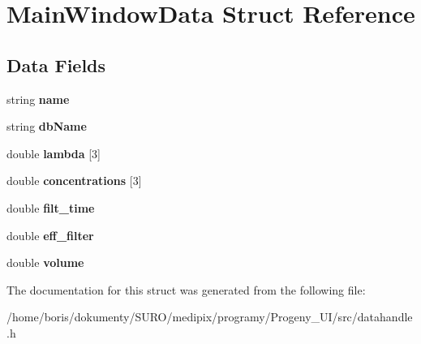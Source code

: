 \hypertarget{structMainWindowData}{\section{Main\+Window\+Data Struct Reference}
\label{structMainWindowData}
}
\subsection*{Data Fields}
\begin{DoxyCompactItemize}
\item 
\hypertarget{structMainWindowData_a13e994aac6efee77384aadf76389582c}{string {\bfseries name}}\label{structMainWindowData_a13e994aac6efee77384aadf76389582c}

\item 
\hypertarget{structMainWindowData_a3a1ed9bff4936fc9560c58c9d7cee92b}{string {\bfseries db\+Name}}\label{structMainWindowData_a3a1ed9bff4936fc9560c58c9d7cee92b}

\item 
\hypertarget{structMainWindowData_a1ad60e01af91667077554f87680a3c85}{double {\bfseries lambda} \mbox{[}3\mbox{]}}\label{structMainWindowData_a1ad60e01af91667077554f87680a3c85}

\item 
\hypertarget{structMainWindowData_a1a5e4366e5e7aa1af8f2aef0de8adb5e}{double {\bfseries concentrations} \mbox{[}3\mbox{]}}\label{structMainWindowData_a1a5e4366e5e7aa1af8f2aef0de8adb5e}

\item 
\hypertarget{structMainWindowData_a3fbc2c6f48e91f8db2b6115398ef4dde}{double {\bfseries filt\+\_\+time}}\label{structMainWindowData_a3fbc2c6f48e91f8db2b6115398ef4dde}

\item 
\hypertarget{structMainWindowData_aed7b2a7e280cf3fd1ff1195034b6f085}{double {\bfseries eff\+\_\+filter}}\label{structMainWindowData_aed7b2a7e280cf3fd1ff1195034b6f085}

\item 
\hypertarget{structMainWindowData_ac3b16f98ddcb0bf66df80b8a9d3b60b5}{double {\bfseries volume}}\label{structMainWindowData_ac3b16f98ddcb0bf66df80b8a9d3b60b5}

\end{DoxyCompactItemize}


The documentation for this struct was generated from the following file\+:\begin{DoxyCompactItemize}
\item 
/home/boris/dokumenty/\+S\+U\+R\+O/medipix/programy/\+Progeny\+\_\+\+U\+I/src/datahandle.\+h\end{DoxyCompactItemize}
